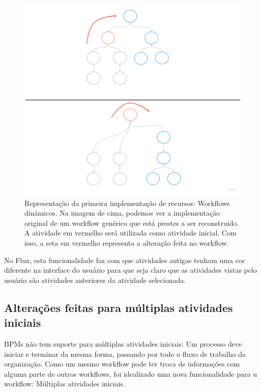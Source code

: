 \begin{figure}
    \centering
    \includegraphics[width=1\textwidth]{imgs/Implementacoes/primeiraImplementacao.png}
    \caption{Representação da primeira implementação de recursos: Workflows dinâmicos. Na imagem de cima, podemos ver a implementação original de um workflow genérico que está prestes a ser reconstruído. A atividade em vermelho será utilizada como atividade inicial. Com isso, a seta em vermelho representa a alteração feita no workflow.}
    \label{fig:primeira_implementacao}
\end{figure}

No Flux, esta funcionalidade faz com que atividades antigas tenham uma cor diferente na interface do usuário para que seja claro que as atividades vistas pelo usuário são atividades anteriores da atividade selecionada.

\subsection{Alterações feitas para múltiplas atividades iniciais}

BPMs não tem suporte para múltiplas atividades iniciais: Um processo deve iniciar e terminar da mesma forma, passando por todo o fluxo de trabalho da organização. \R
Como um mesmo workflow pode ter troca de informações com alguma parte de outros workflows, foi idealizado uma nova funcionalidade para u workflow: Múltiplas atividades iniciais.

